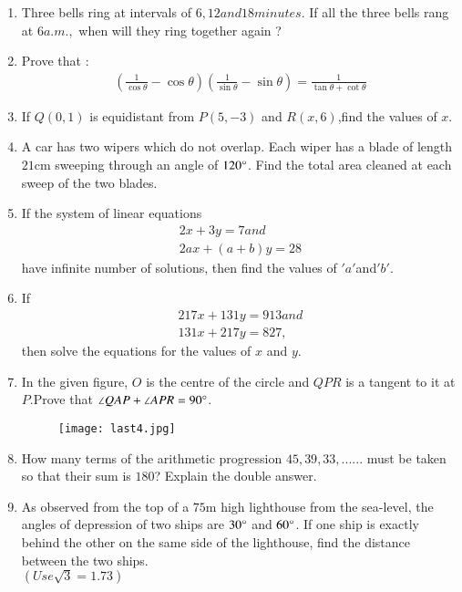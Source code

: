 \documentclass[12pt,-letter paper]{article}
\providecommand{\brak}[1]{\ensuremath{\left(#1\right)}}
\begin{document}
\begin{enumerate}
\item Three bells ring at intervals of $ 6, 12 and 18 minutes$. If all the three bells rang at $ 6 a.m.,$ when will they ring together again ?

\item Prove that :
\begin{align}
	\brak{\frac{1}{\cos\theta}-\cos\theta} \brak{\frac{1}{\sin\theta}-\sin\theta} = \frac{1}{\tan\theta + \cot\theta}
\end{align}

\item If $Q\brak{0,1}$ is equidistant from $P\brak{5,-3}$ and $R\brak{x,6}$,find the values of $x$.	

\item A car has two wipers which do not overlap. Each wiper has a blade of length $21 \mathrm{cm}$ sweeping through an angle of $120\degree$. Find the total area cleaned at each sweep of the two blades.

\item If the system of linear equations  \\ 		
\begin{align}
		2x + 3y = 7 and \\ 
		2ax + \brak{a+b}y = 28
\end{align}
\text have infinite number of solutions, then find the values of $' a '$and$' b '$.

\item If
\begin{align}
	 217x + 131y = 913 and \\
         131x + 217y = 827,
\end{align}
 then solve the equations for the values of $x$ and $y$.
\item In the given figure, $O$ is the centre of the circle and $QPR$ is a tangent to it at $P$.Prove that $\angle QAP + \angle APR = 90\degree$.

	\begin{figure}[!ht]
		\centering
		\texttt{[image: last4.jpg]}
		\caption{}
		\label{fig:enter-label}
	\end{figure}
\newpage
\item How many terms of the arithmetic progression $45,39,33,......$ must be taken so that their sum is $180$? Explain the double answer.

\item As observed from the top of a $75 \mathrm{m}$ high lighthouse from the sea-level, the angles of depression of two ships are $30\degree$ and $60\degree$. If one ship is exactly behind the other on the same side of the lighthouse, find the distance between the two ships.\\
	$\brak{Use \sqrt{3} = 1.73}$


\end{enumerate}
\end{document}
